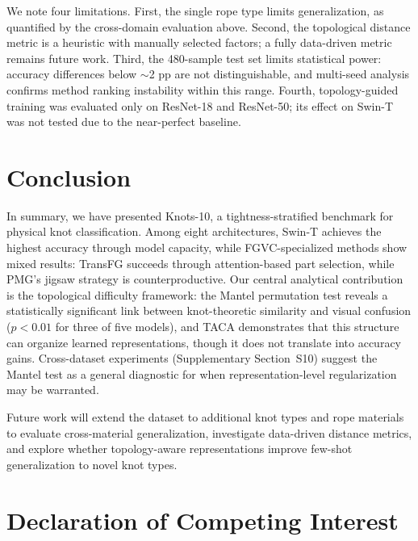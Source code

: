 \documentclass[preprint,review,12pt]{elsarticle}
\begin{document}
We note four limitations. First, the single rope type limits generalization, as quantified by the cross-domain evaluation above. Second, the topological distance metric is a heuristic with manually selected factors; a fully data-driven metric remains future work. Third, the 480-sample test set limits statistical power: accuracy differences below $\sim$2 pp are not distinguishable, and multi-seed analysis confirms method ranking instability within this range. Fourth, topology-guided training was evaluated only on ResNet-18 and ResNet-50; its effect on Swin-T was not tested due to the near-perfect baseline.


\section{Conclusion}
\label{sec:conclusion}

In summary, we have presented Knots-10, a tightness-stratified benchmark for physical knot classification. Among eight architectures, Swin-T achieves the highest accuracy through model capacity, while FGVC-specialized methods show mixed results: TransFG succeeds through attention-based part selection, while PMG's jigsaw strategy is counterproductive. Our central analytical contribution is the topological difficulty framework: the Mantel permutation test reveals a statistically significant link between knot-theoretic similarity and visual confusion ($p < 0.01$ for three of five models), and TACA demonstrates that this structure can organize learned representations, though it does not translate into accuracy gains. Cross-dataset experiments (Supplementary Section~S10) suggest the Mantel test as a general diagnostic for when representation-level regularization may be warranted.

Future work will extend the dataset to additional knot types and rope materials to evaluate cross-material generalization, investigate data-driven distance metrics, and explore whether topology-aware representations improve few-shot generalization to novel knot types.



\section*{Declaration of Competing Interest}
\end{document}
